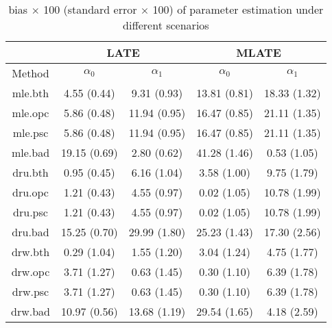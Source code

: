 \documentclass{article}
\begin{document}
\begin{table}
\footnotesize
\centering
\begin{tabular}[h]{c|cc|cc}
\toprule
    & \multicolumn{2}{c|}{LATE} &\multicolumn{2}{c}{MLATE}\\
\midrule
    Method & $\alpha_0$ & $\alpha_1$ & $\alpha_0$ & $\alpha_1$\\
\midrule
    mle.bth&4.55 (0.44) & 9.31 (0.93)&13.81 (0.81) & 18.33 (1.32)\\
    mle.opc&5.86 (0.48) & 11.94 (0.95)&16.47 (0.85) & 21.11 (1.35)\\
    mle.psc&5.86 (0.48) & 11.94 (0.95)&16.47 (0.85) & 21.11 (1.35)\\
    mle.bad&19.15 (0.69) & 2.80 (0.62)&41.28 (1.46) & 0.53 (1.05)\\
    dru.bth&0.95 (0.45) & 6.16 (1.04)&3.58 (1.00) & 9.75 (1.79)\\
    dru.opc&1.21 (0.43) & 4.55 (0.97)&0.02 (1.05) & 10.78 (1.99)\\
    dru.psc&1.21 (0.43) & 4.55 (0.97)&0.02 (1.05) & 10.78 (1.99)\\
    dru.bad&15.25 (0.70) & 29.99 (1.80)&25.23 (1.43) & 17.30 (2.56)\\
    drw.bth&0.29 (1.04) & 1.55 (1.20)&3.04 (1.24) & 4.75 (1.77)\\
    drw.opc&3.71 (1.27) & 0.63 (1.45)&0.30 (1.10) & 6.39 (1.78)\\
    drw.psc&3.71 (1.27) & 0.63 (1.45)&0.30 (1.10) & 6.39 (1.78)\\
    drw.bad&10.97 (0.56) & 13.68 (1.19)&29.54 (1.65) & 4.18 (2.59)\\
\bottomrule
\end{tabular}
\caption{bias $\times$ 100 (standard error $\times$ 100) of parameter estimation under different scenarios}
\end{table}
\end{document}
